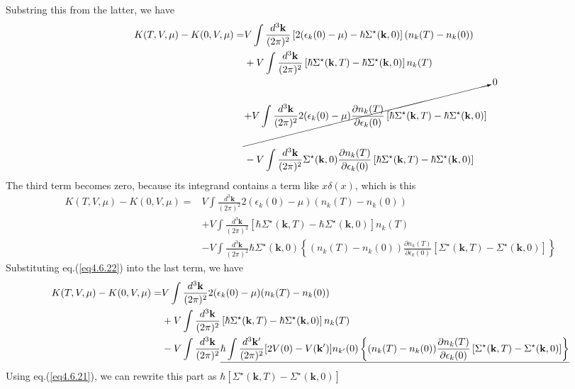 Substring this from the latter, we have
\[
\begin{aligned}
K(T,V,\mu)-K(0,V,\mu)=&V\int \frac{d^3 \mathbf{k}}{(2\pi)^2} \left[ 2(\epsilon_k(0)-\mu)-\hbar \Sigma^\star (\mathbf{k},0) \right] (n_k(T)-n_k(0))\\
&+V\int \frac{d^3 \mathbf{k}}{(2\pi)^2}  \left[\hbar \Sigma^\star (\mathbf{k},T) - \hbar \Sigma^\star (\mathbf{k},0) \right] n_k(T)\\
& \cancelto{0}{+V\int \frac{d^3 \mathbf{k}}{(2\pi)^2} 2(\epsilon_k(0)-\mu) \frac{\partial n_k(T)}{\partial \epsilon_k(0)}  \left[\hbar \Sigma^\star (\mathbf{k},T) - \hbar \Sigma^\star (\mathbf{k},0) \right] }\\
&\\
&-V\int \frac{d^3 \mathbf{k}}{(2\pi)^2} \Sigma^\star(\mathbf{k},0)  \frac{\partial n_k(T)}{\partial \epsilon_k(0)}  \left[\hbar \Sigma^\star (\mathbf{k},T) - \hbar \Sigma^\star (\mathbf{k},0) \right] 
\end{aligned}
\]
The third term becomes zero, because its integrand contains a term like $x \delta(x)$, which is this
\[
\begin{aligned}
K(T,V,\mu)-K(0,V,\mu)=&V\int \frac{d^3 \mathbf{k}}{(2\pi)^2} 2(\epsilon_k(0)-\mu) (n_k(T)-n_k(0))\\
&+V\int \frac{d^3 \mathbf{k}}{(2\pi)^2}  \left[\hbar \Sigma^\star (\mathbf{k},T) - \hbar \Sigma^\star (\mathbf{k},0) \right] n_k(T)\\
&-V\int \frac{d^3 \mathbf{k}}{(2\pi)^2} \hbar \Sigma^\star(\mathbf{k},0) \left\{ (n_k(T)-n_k(0)) \frac{\partial n_k(T)}{\partial \epsilon_k(0)}  \left[ \Sigma^\star (\mathbf{k},T) -  \Sigma^\star (\mathbf{k},0) \right] \right\}
\end{aligned}
\]
 Substituting eq.(\ref{eq4.6.22}) into the last term, we have
\[
\begin{aligned}
K(T,V,\mu)-K(0,V,\mu)=&V\int \frac{d^3 \mathbf{k}}{(2\pi)^2} 2(\epsilon_k(0)-\mu) (n_k(T)-n_k(0))\\
&+V\int \frac{d^3 \mathbf{k}}{(2\pi)^2}  \left[\hbar \Sigma^\star (\mathbf{k},T) - \hbar \Sigma^\star (\mathbf{k},0) \right] n_k(T)\\
&-V\int \frac{d^3 \mathbf{k}}{(2\pi)^2}\uline{ \hbar \int \frac{d^3 \mathbf{k}'}{(2\pi)^2} [2V(0)-V(\mathbf{k}')] n_{k'}(0) \left\{ (n_k(T)-n_k(0)) \frac{\partial n_k(T)}{\partial \epsilon_k(0)}  \left[ \Sigma^\star (\mathbf{k},T) -  \Sigma^\star (\mathbf{k},0) \right] \right\} }
\end{aligned}
\]
 Using eq.(\ref{eq4.6.21}), we can rewrite this part as $\hbar \left[ \Sigma^\star (\mathbf{k},T) -  \Sigma^\star (\mathbf{k},0) \right]$
